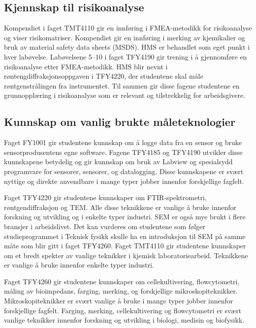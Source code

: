 \documentclass{article}
\begin{document}
\subsection{Kjennskap til risikoanalyse}
Kompendiet i faget TMT4110 gir en innføring i FMEA-metodikk for risikoanalyse og viser risikomatriser. Kompendiet gir en innføring i merking av kjemikalier og bruk av material safety data sheets (MSDS). HMS er behandlet som eget punkt i hver labøvelse. Labøvelsene 5--10 i faget TFY4190 gir trening i å gjennomføre en risikoanalyse etter FMEA-metodikk. HMS blir nevnt i røntengdiffraksjonsoppgaven i TFY4220, der studentene skal måle røntgenstrålingen fra instrumentet.
Til sammen gir disse fagene studentene en grunnopplæring i risikoanalyse som er relevant og tilstrekkelig for arbeidsgivere.

\subsection{Kunnskap om vanlig brukte måleteknologier}
\label{Teknikker}
Faget FY1001 gir studentene kunnskap om å logge data fra en sensor og bruke sensorprodusentens egne software. Fagene TFY4185 og TFY4190 utvikler disse kunnskapene betydelig og gir kunnskap om bruk av Labview og spesialsydd programvare for sensorer, sensorer, og datalogging. Disse kunnskapene er svært nyttige og direkte anvendbare i mange typer jobber innenfor forskjellige fagfelt.

Faget TFY4220 gir studentene kunnskaper om FTIR-spektrometri, røntgendiffraksjon og TEM. Alle disse teknikkene er vanlige å bruke innenfor forskning og utvikling og i enkelte typer industri. SEM er også mye brukt i flere bransjer i arbeidslivet. Det kan vurderes om studentene som følger studieprogrammet i Teknisk fysikk skulle ha en introduksjon til SEM på samme måte som blir gitt i faget TFY4260.
Faget TMT4110 gir studentene kunnskaper om et bredt spekter av vanlige teknikker i kjemisk laboratoriearbeid. Teknikkene er vanlige å bruke innenfor enkelte typer industri.

Faget TFY4260 gir studentene kunnskaper om cellekultivering, flowcytometri, måling av bioimpedans, farging, merking, og forskjellige mikroskopiteknikker. Mikroskopiteknikker er svært vanlige å bruke i mange typer jobber innenfor forskjellige fagfelt. Farging, merking, cellekultivering og flowcytometri er svært vanlige teknikker innenfor forskning og utvikling i biologi, medisin og biofysikk.
\end{document}
